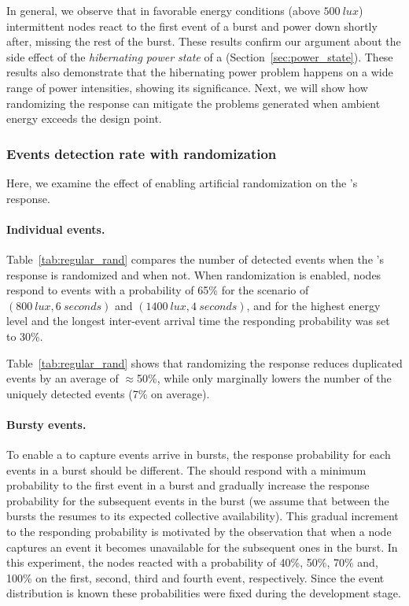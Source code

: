 In general, we observe that in favorable energy conditions (above $\SI{500}{lux}$) intermittent nodes react to the first event of a burst and power down shortly after, missing the rest of the burst. These results confirm our argument about the side effect of the \textit{hibernating power state} of a \cis (Section~\ref{sec:power_state}). These results also demonstrate that the hibernating power problem happens on a wide range of power intensities, showing its significance. Next, we will show how randomizing the response can mitigate the problems generated when ambient energy exceeds the design point. 

\subsubsection{Events detection rate with randomization}

Here, we examine the effect of enabling artificial randomization on the \cis's response. 

\paragraph{Individual events.} 
Table~\ref{tab:regular_rand} compares the number of detected events when the
\cim's response is randomized and when not.
When randomization is enabled, nodes respond to events with a probability of 65\% for the scenario of $\left(\SI{800}{lux}, \SI{6}{seconds}\right)$ and $\left(\SI{1400}{lux}, \SI{4}{seconds}\right)$, and for the highest energy level and the longest inter-event arrival time the responding probability was set to 30\%.

Table~\ref{tab:regular_rand} shows that randomizing the response reduces duplicated events by an average of $\approx$50\%, while only marginally lowers the number of the uniquely detected events (7\% on average). 


\paragraph{Bursty events.}

To enable a \cis to capture events arrive in bursts, the response probability for each events in a burst should be different. The \cis should respond with a minimum probability to the first event in a burst and gradually increase the response probability for the subsequent events in the burst (we assume that between the bursts the \cis resumes to its expected collective availability). This gradual increment to the responding probability is motivated by the observation that when a node captures an event it becomes unavailable for the subsequent ones in the burst.
In this experiment, the nodes reacted with a probability of 40\%, 50\%, 70\% and, 100\% on the first, second, third and fourth event, respectively. Since the event distribution is known these probabilities were fixed during the development stage.

